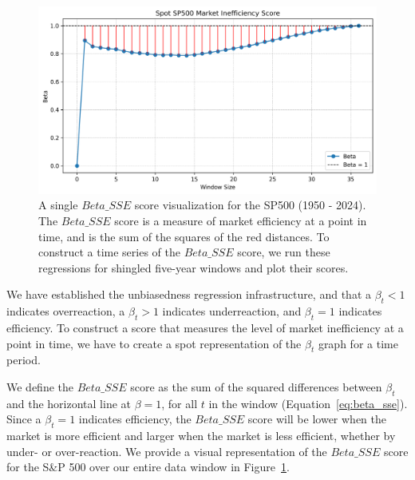 \begin{figure}[h!]
    \centering
    \includegraphics[width=1\textwidth]{../figs/Spot SP500 Market Inefficiency Score.png}
    \caption{A single $Beta\_SSE$ score visualization for the SP500 (1950 - 2024). The $Beta\_SSE$ score is a measure of market efficiency at a point in time, and is the sum of 
    the squares of the red distances. To construct a time series of the $Beta\_SSE$ score, we run these regressions for shingled five-year windows and plot their scores.}
    \label{fig:sp_500_unbiasedness_sse}
\end{figure}

We have established the unbiasedness regression infrastructure, and that a $\beta_t < 1$ indicates overreaction, a $\beta_t > 1$ indicates underreaction, and $\beta_t = 1$ indicates efficiency.
To construct a score that measures the level of market inefficiency at a point in time, we have to create a spot representation of the $\beta_t$ graph for a time period.

We define the $Beta\_SSE$ score as the sum of the squared differences between $\beta_t$ and the horizontal line at $\beta = 1$, for all $t$ in the window (Equation~\ref{eq:beta_sse}).
Since a $\beta_t = 1$ indicates efficiency, the $Beta\_SSE$ score will be lower when the market is more efficient and larger when the market is less efficient, whether by under- or over-reaction.
We provide a visual representation of the $Beta\_SSE$ score for the S\&P 500 over our entire data window in Figure~\ref{fig:sp_500_unbiasedness_sse}.

